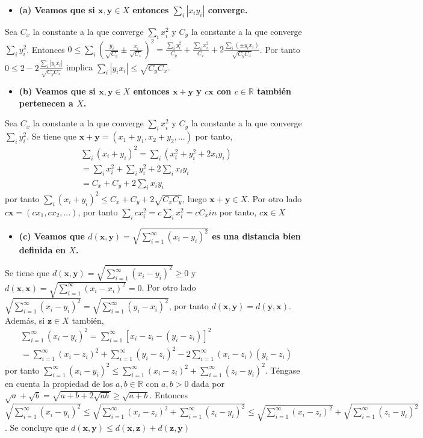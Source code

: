 \documentclass{article}
\newcommand{\vect}[1]{\boldsymbol{#1}}
\begin{document}
\begin{itemize}
\item \bf (a) \rm Veamos que si $\vect{x},\vect{y}\in X$ entonces $\sum_i|x_iy_i|$ converge.
\end{itemize}
Sea $C_x$ la constante a la que converge $\sum_i x_i^2$ y $C_y$ la constante a la que converge $\sum_i y_i^2$. Entonces $0\leq\sum_i\left(\frac{y_i}{\sqrt{C_y}}\pm\frac{x_i}{\sqrt{C_x}}\right)^2=\frac{\sum_iy_i^2}{C_y}+\frac{\sum_ix_i^2}{C_x}+2\frac{\sum_i(\pm y_ix_i)}{\sqrt{C_yC_x}}$. Por tanto $0\leq 2- 2\frac{\sum_i|y_ix_i|}{\sqrt{C_yC_x}}$ implica $\sum_i| y_ix_i|\leq \sqrt{C_y C_x}$.
\begin{itemize}
\item \bf (b) \rm Veamos que si $\vect{x},\vect{y}\in X$ entonces $\vect{x}+\vect{y}$ y $c\vect{x}$ con $c\in \mathbb{R}$ también pertenecen a $X$.
\end{itemize}
Sea $C_x$ la constante a la que converge $\sum_i x_i^2$ y $C_y$ la constante a la que converge $\sum_i y_i^2$. Se tiene que $\vect{x}+\vect{y}=(x_1+y_1,x_2+y_2,...)$ por tanto,
\begin{eqnarray}
\sum_i(x_i+y_i)^2=\sum_i(x_i^2+y_i^2+2x_iy_i)\nonumber\\
=\sum_ix_i^2+\sum_iy_i^2+2\sum_ix_iy_i\nonumber\\
=C_x+C_y+2\sum_ix_iy_i\nonumber
\end{eqnarray}
por tanto $\sum_i(x_i+y_i)^2\leq C_x+C_y+2\sqrt{C_xC_y}$, luego $\vect{x}+\vect{y}\in X$. Por otro lado $c\vect{x}=(cx_1,cx_2,...)$, por tanto $\sum_icx_i^2=c\sum_ix_i^2=cC_xin$ por tanto, $c\vect{x}\in X$
\begin{itemize}
\item \bf (c) \rm Veamos que $d(\vect{x},\vect{y})=\sqrt{\sum_{i=1}^\infty(
x_i-y_i)^2}$ es una distancia bien definida en $X$.
\end{itemize}
Se tiene que $d(\vect{x},\vect{y})=\sqrt{\sum_{i=1}^\infty(
x_i-y_i)^2}\geq 0$ y $d(\vect{x},\vect{x})=\sqrt{\sum_{i=1}^\infty(
x_i-x_i)^2}=0$. Por otro lado $\sqrt{\sum_{i=1}^\infty(
x_i-y_i)^2}=\sqrt{\sum_{i=1}^\infty(
y_i-x_i)^2}$, por tanto $d(\vect{x},\vect{y})=d(\vect{y},\vect{x})$. Además, si $\vect{z}\in X$ también, 
\begin{eqnarray}
\sum_{i=1}^\infty(
x_i-y_i)^2=\sum_{i=1}^\infty[
x_i-z_i-(y_i-z_i)]^2\nonumber\\
= \sum_{i=1}^\infty(x_i-z_i)^2+\sum_{i=1}^\infty(y_i-z_i)^2-2\sum_{i=1}^\infty(x_i-z_i)(y_i-z_i)\nonumber
\end{eqnarray}
por tanto $\sum_{i=1}^\infty(
x_i-y_i)^2\leq \sum_{i=1}^\infty(
x_i-z_i)^2+\sum_{i=1}^\infty(
z_i-y_i)^2$. Téngase en cuenta la propiedad de los $a,b\in \mathbb{R}$ con $a,b>0$ dada por  $\sqrt{a}+\sqrt{b}=\sqrt{ a+b+2\sqrt{ab}}\geq \sqrt{a+b}$. Entonces $\sqrt{\sum_{i=1}^\infty(
x_i-y_i)^2}\leq \sqrt{\sum_{i=1}^\infty(
x_i-z_i)^2+\sum_{i=1}^\infty(
z_i-y_i)^2}\leq \sqrt{\sum_{i=1}^\infty(
x_i-z_i)^2}+\sqrt{\sum_{i=1}^\infty(
z_i-y_i)^2}$. Se concluye que $d(\vect{x},\vect{y})\leq d(\vect{x},\vect{z})+d(\vect{z},\vect{y})$
\end{document}
